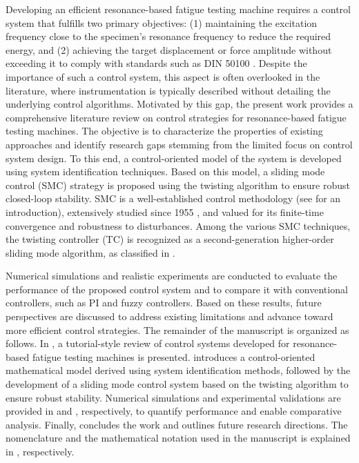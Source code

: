 \documentclass[lettersize,journal]{IEEEtran}
\begin{document}
Developing an efficient resonance-based fatigue testing machine requires a control system that fulfills two primary objectives: (1) maintaining the excitation frequency close to the specimen’s resonance frequency to reduce the required energy, and (2) achieving the target displacement or force amplitude without exceeding it to comply with standards such as DIN 50100 \cite{DIN_standard}. Despite the importance of such a control system, this aspect is often overlooked in the literature, where instrumentation is typically described without detailing the underlying control algorithms. Motivated by this gap, the present work provides a comprehensive literature review on control strategies for resonance-based fatigue testing machines. The objective is to characterize the properties of existing approaches and identify research gaps stemming from the limited focus on control system design. To this end, a control-oriented model of the system is developed using system identification techniques. Based on this model, a sliding mode control (SMC) strategy is proposed using the twisting algorithm to ensure robust closed-loop stability. SMC is a well-established control methodology (see \cite{Slotine1991} for an introduction), extensively studied since 1955 \cite{Utkin1955}, and valued for its finite-time convergence and robustness to disturbances. Among the various SMC techniques, the twisting controller (TC) \cite{UTKIN2020_higher_order, Orlov_twisting, Utkin_twisting, POLYAKOV_twisting, Santiesteban_twisting, TORRESGONZALEZ2017_twisting, Santiesteban_twisting} is recognized as a second-generation higher-order sliding mode algorithm, as classified in \cite{Fridman2015}.


Numerical simulations and realistic experiments are conducted to evaluate the performance of the proposed control system and to compare it with conventional controllers, such as PI and fuzzy controllers. Based on these results, future perspectives are discussed to address existing limitations and advance toward more efficient control strategies. The remainder of the manuscript is organized as follows. In , a tutorial-style review of control systems developed for resonance-based fatigue testing machines is presented.  introduces a control-oriented mathematical model derived using system identification methods, followed by the development of a sliding mode control system based on the twisting algorithm to ensure robust stability. Numerical simulations and experimental validations are provided in  and , respectively, to quantify performance and enable comparative analysis. Finally,  concludes the work and outlines future research directions. The nomenclature and the mathematical notation used in the manuscript is explained in , respectively.
\end{document}
